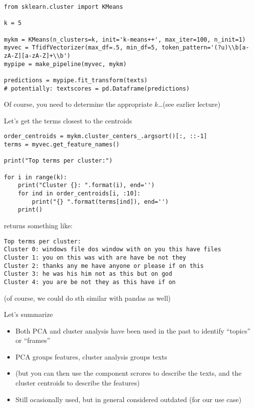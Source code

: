 \begin{frame}
\begin{verbatim}
from sklearn.cluster import KMeans

k = 5

mykm = KMeans(n_clusters=k, init='k-means++', max_iter=100, n_init=1)
myvec = TfidfVectorizer(max_df=.5, min_df=5, token_pattern='(?u)\\b[a-zA-Z][a-zA-Z]+\\b')
mypipe = make_pipeline(myvec, mykm)

predictions = mypipe.fit_transform(texts)
# potentially: textscores = pd.Dataframe(predictions)
\end{verbatim}

Of course, you need to determine the appropriate $k$\ldots (see earlier lecture)



\end{frame}


\begin{frame}{Let's get the terms closest to the centroids}
\begin{lstlisting}
order_centroids = mykm.cluster_centers_.argsort()[:, ::-1]
terms = myvec.get_feature_names()

print("Top terms per cluster:")

for i in range(k):
    print("Cluster {}: ".format(i), end='')
    for ind in order_centroids[i, :10]:
        print("{} ".format(terms[ind]), end='')
    print()

\end{lstlisting}
\pause
returns something like:

\begin{lstlisting}
Top terms per cluster:
Cluster 0: windows file dos window with on you this have files 
Cluster 1: you on this was with are have be not they 
Cluster 2: thanks any me have anyone or please if on this 
Cluster 3: he was his him not as this but on god 
Cluster 4: you are be not they as this have if on 
\end{lstlisting}
(of course, we could do sth similar with pandas as well)
\end{frame}






\begin{frame}{Let's summarize}
  \begin{itemize}
  \item Both PCA \parencite[e.g.][]{Greussing2017} and cluster analysis \parencite[e.g.,][]{burscher2016} have been used in the past to identify ``topics'' or ``frames''
  \item PCA groups features, cluster analysis groups texts
  \item (but you can then use the component scrores to describe the texts, and the cluster centroids to describe the features)
  \item Still ocasionally used, but in general considered outdated (for our use case)
  \end{itemize}

\end{frame}





